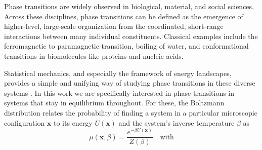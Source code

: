 

\label{ch4:sec:Free Energy Landscapes and Phase Transitions}


Phase transitions are widely observed in biological, material, and social sciences. Across these disciplines, phase transitions can be defined as the emergence of higher-level, large-scale organization from the coordinated, short-range interactions between many individual constituents. Classical examples include the ferromagnetic to paramagnetic transition, boiling of water, and conformational transitions in biomolecules like proteins and nucleic acids.

Statistical mechanics, and especially the framework of energy landscapes, provides a simple and unifying way of studying phase transitions in these diverse systems \cite{wales-energy-landscapes}. In this work we are specifically interested in phase transitions in systems that stay in equilibrium throughout. For these, the Boltzmann distribution relates the probability of finding a system in a particular microscopic configuration $\mathbf{x}$ to its energy $U(\mathbf{x})$ and the system's inverse temperature $\beta$ as
\begin{equation}
\label{ch4:eq:boltzmann}
\mu(\mathbf{x},\beta) = \frac{e^{ -\beta U(\mathbf{x})}}{Z(\beta)} \quad \text{with}
\end{equation}

